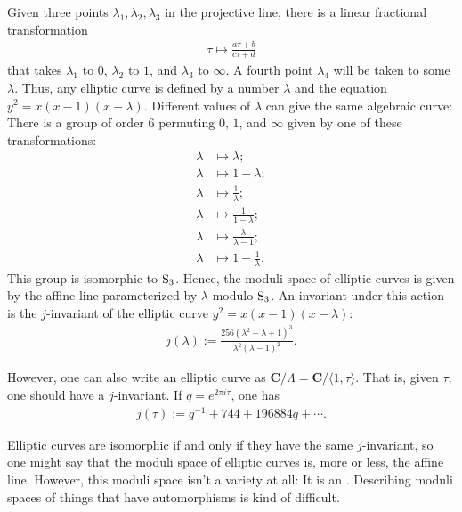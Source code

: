 \documentclass [11 pt, oneside] {article}
\begin{document}
Given three points $\lambda_1,\lambda_2,\lambda_3$ in the projective line, there is a linear fractional transformation 
\begin{align*}
	\tau\longmapsto \frac{a\tau+b}{c\tau+d}
\end{align*}
that takes $\lambda_1$ to $0$, $\lambda_2$ to $1$, and $\lambda_3$ to $\infty$. A fourth point $\lambda_4$ will be taken to some $\lambda$. Thus, any elliptic curve is defined by a number $\lambda$ and the equation $y^2=x(x-1) (x-\lambda)$. Different values of $\lambda$ can give the same algebraic curve: There is a group of order $6$ permuting $0$, $1$, and $\infty$ given by one of these transformations:
\begin{align*}
	\lambda&\longmapsto\lambda;\\
	\lambda&\longmapsto 1-\lambda;\\
	\lambda&\longmapsto\frac{1}{\lambda};\\
	\lambda&\longmapsto \frac{1}{1-\lambda};\\
	\lambda&\longmapsto \frac{\lambda}{\lambda-1};\\
	\lambda&\longmapsto 1-\frac{1}{\lambda}.
\end{align*}
This group is isomorphic to $\operatorname{S}_3$. Hence, the moduli space of elliptic curves is given by the affine line parameterized by $\lambda$ modulo $\operatorname{S}_3$. An invariant under this action is the $j$-invariant of the elliptic curve $y^2 = x(x-1) (x-\lambda)$:
\begin{align*}
	j(\lambda) := \frac{256(\lambda^2-\lambda+1)^3}{\lambda^2(\lambda-1)^2}.
\end{align*}

However, one can also write an elliptic curve as $\mathbf{C}/\Lambda=\mathbf{C}/\langle 1,\tau\rangle$. That is, given $\tau$, one should have a $j$-invariant. If $q=e^{2\pi i\tau}$, one has
\begin{align*}
	j(\tau) := q ^{-1} + 744 + 196884q + \cdots.
\end{align*}

Elliptic curves are isomorphic if and only if they have the same $j$-invariant, so one might say that the moduli space of elliptic curves is, more or less, the affine line. However, this moduli space isn't a variety at all: It is an . Describing moduli spaces of things that have automorphisms is kind of difficult.
\end{document}
